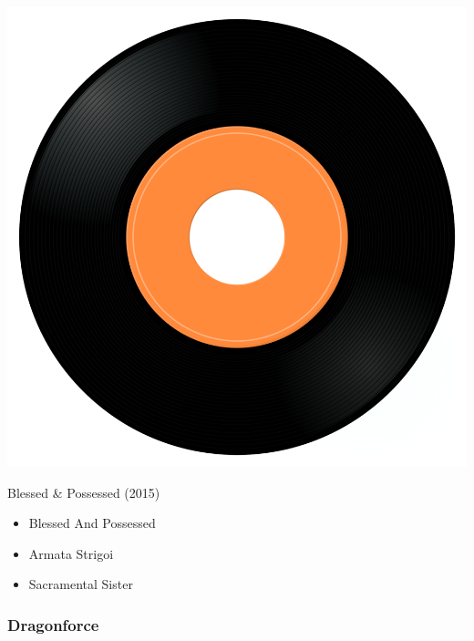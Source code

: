 \begin{minipage}[t]{0.25\textwidth}
\captionsetup{type=figure}
\includegraphics[width=\textwidth]{Images/cover.png}
\caption*{Blessed \& Possessed (2015)}
\end{minipage}
\begin{minipage}[t]{0.25\textwidth}\vspace{0pt}
\begin{itemize}[nosep,leftmargin=1em,labelwidth=*,align=left]
	\setlength{\itemsep}{0pt}
	\item Blessed And Possessed
	\item Armata Strigoi
	\item Sacramental Sister
\end{itemize}
\end{minipage}

\subsubsection{Dragonforce}

